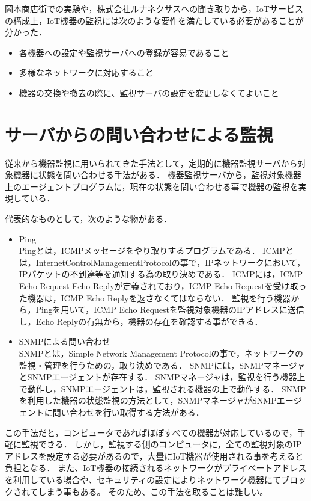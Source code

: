
岡本商店街での実験や，株式会社ルナネクサスへの聞き取りから，IoTサービスの構成上，IoT機器の監視には次のような要件を満たしている必要があることが分かった．
\begin{itemize}
\item 各機器への設定や監視サーバへの登録が容易であること
\item 多様なネットワークに対応すること
\item 機器の交換や撤去の際に、監視サーバの設定を変更しなくてよいこと
\end{itemize}


\section{サーバからの問い合わせによる監視}
	従来から機器監視に用いられてきた手法として，定期的に機器監視サーバから対象機器に状態を問い合わせる手法がある．
	機器監視サーバから，監視対象機器上のエージェントプログラムに，現在の状態を問い合わせる事で機器の監視を実現している．
	\medskip

	代表的なものとして，次のような物がある．
	\begin{itemize}
		\item Ping\\
			Pingとは，ICMPメッセージをやり取りするプログラムである．
			ICMPとは，InternetControlManagementProtocolの事で，IPネットワークにおいて，IPパケットの不到達等を通知する為の取り決めである．
			ICMPには，ICMP Echo Request Echo Replyが定義されており，ICMP Echo Requestを受け取った機器は，ICMP Echo Replyを返さなくてはならない．
			監視を行う機器から，Pingを用いて，ICMP Echo Requestを監視対象機器のIPアドレスに送信し，Echo Replyの有無から，機器の存在を確認する事ができる．
		\item SNMPによる問い合わせ\\
			SNMPとは，Simple Network Management Protocolの事で，ネットワークの監視・管理を行うための，取り決めである．
			SNMPには，SNMPマネージャとSNMPエージェントが存在する．
			SNMPマネージャは，監視を行う機器上で動作し，SNMPエージェントは，監視される機器の上で動作する．
			SNMPを利用した機器の状態監視の方法として，SNMPマネージャがSNMPエージェントに問い合わせを行い取得する方法がある．
	\end{itemize}
	
	この手法だと，コンピュータであればほぼすべての機器が対応しているので，手軽に監視できる．
	しかし，監視する側のコンピュータに，全ての監視対象のIPアドレスを設定する必要があるので，大量にIoT機器が使用される事を考えると負担となる．
	また、IoT機器の接続されるネットワークがプライベートアドレスを利用している場合や、セキュリティの設定によりネットワーク機器にてブロックされてしまう事もある。
	そのため、この手法を取ることは難しい。

